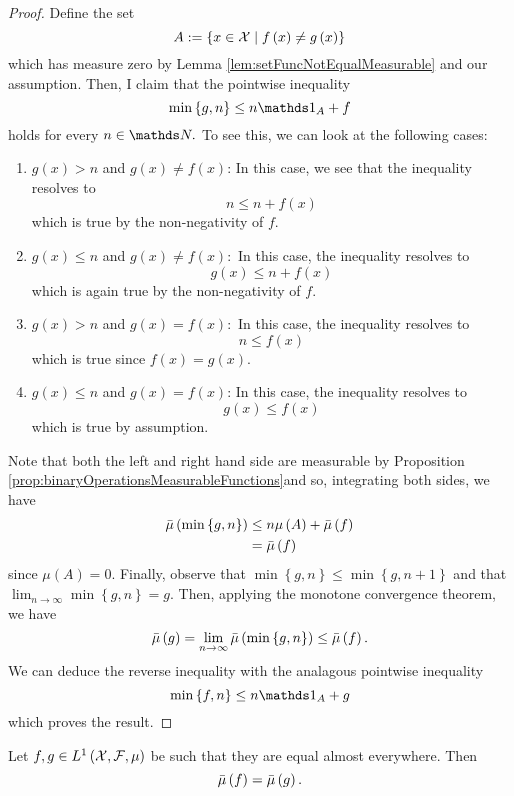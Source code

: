 \begin{proof}
Define the set 
\[
A:=\left\{ x\in\mathcal{X}\mid f\left(x\right)\neq g\left(x\right)\right\} 
\]
which has measure zero by Lemma \ref{lem:setFuncNotEqualMeasurable}
and our assumption. Then, I claim that the pointwise inequality
\[
\min\left\{ g,n\right\} \leq n\indicate_{A}+f
\]
holds for every $n\in\N.$ To see this, we can look at the following
cases:

\begin{enumerate}

\item$g\left(x\right)>n$ and $g\left(x\right)\neq f\left(x\right)$:
In this case, we see that the inequality resolves to 
\[
n\leq n+f\left(x\right)
\]
which is true by the non-negativity of $f.$

\item$g\left(x\right)\leq n$ and $g\left(x\right)\neq f\left(x\right):$
In this case, the inequality resolves to 
\[
g\left(x\right)\leq n+f\left(x\right)
\]
which is again true by the non-negativity of $f.$

\item$g\left(x\right)>n$ and $g\left(x\right)=f\left(x\right):$
In this case, the inequality resolves to 
\[
n\leq f\left(x\right)
\]
which is true since $f\left(x\right)=g\left(x\right).$

\item$g\left(x\right)\leq n$ and $g\left(x\right)=f\left(x\right)$:
In this case, the inequality resolves to 
\[
g\left(x\right)\leq f\left(x\right)
\]
which is true by assumption.

\end{enumerate}

Note that both the left and right hand side are measurable by Proposition
\ref{prop:binaryOperationsMeasurableFunctions}and so, integrating
both sides, we have
\begin{align*}
\bar{\mu}\left(\min\left\{ g,n\right\} \right) & \leq n\mu\left(A\right)+\bar{\mu}\left(f\right)\\
 & =\bar{\mu}\left(f\right)
\end{align*}
since $\mu\left(A\right)=0.$ Finally, observe that $\min\left\{ g,n\right\} \leq\min\left\{ g,n+1\right\} $
and that $\lim_{n\to\infty}\min\left\{ g,n\right\} =g.$ Then, applying
the monotone convergence theorem, we have 
\[
\bar{\mu}\left(g\right)=\lim_{n\to\infty}\bar{\mu}\left(\min\left\{ g,n\right\} \right)\leq\bar{\mu}\left(f\right).
\]
We can deduce the reverse inequality with the analagous pointwise
inequality
\[
\min\left\{ f,n\right\} \leq n\indicate_{A}+g
\]
which proves the result.
\end{proof}
\begin{cor}
\label{cor:LPfuncEqualityAlmostEverywhere}Let $f,g\in L^{1}\left(\mathcal{X},\mathcal{F},\mu\right)$
be such that they are equal almost everywhere. Then
\[
\bar{\mu}\left(f\right)=\bar{\mu}\left(g\right).
\]
\end{cor}

